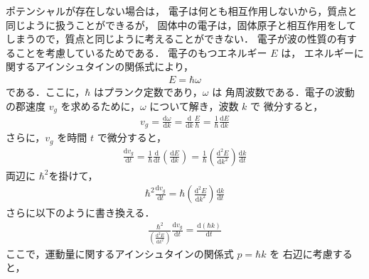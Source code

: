                 ポテンシャルが存在しない場合は，
                電子は何とも相互作用しないから，質点と同じように扱うことができるが，
                固体中の電子は，固体原子と相互作用をしてしまうので，質点と同じように考えることができない．
                電子が波の性質の有することを考慮しているためである．
                電子のもつエネルギー $E$ は，
                エネルギーに関するアインシュタインの関係式により，
                   \begin{align}
                        E=\hbar \omega
                   \end{align}
                である．ここに，$\hbar$ はプランク定数であり，$\omega$ は
                角周波数である．電子の波動の郡速度 $v_{g}$ を求めるために，$\omega$ について解き，波数 $k$ で
                微分すると，
                    \begin{align}
                        v_{g}=\frac{\mathrm{d} \omega}{\mathrm{d} k} = \frac{\mathrm{d} }{\mathrm{d} k}\frac{E}{\hbar}
                        =\frac{1}{\hbar}\frac{\mathrm{d} E}{\mathrm{d} k}
                    \end{align}
                さらに，$v_{g}$ を時間 $t$ で微分すると，
                   \begin{align}
                    \frac{\mathrm{d} v_{g}}{\mathrm{d} t}=\frac{1}{\hbar}\frac{\mathrm{d}}{\mathrm{d} t}
                    \left(\frac{\mathrm{d} E}{\mathrm{d} k}\right)
                    =\frac{1}{\hbar}
                    \left(\frac{\mathrm{d}^{2} E}{\mathrm{d} k^{2}}\right)
                    \frac{\mathrm{d} k}{\mathrm{d} t}
                   \end{align}
                両辺に $\hbar^{2}$を掛けて，
                    \begin{align}
                     \hbar^{2}\frac{\mathrm{d} v_{g}}{\mathrm{d} t}
                     =\hbar\left(\frac{\mathrm{d}^{2} E}{\mathrm{d} k^{2}}\right)\frac{\mathrm{d} k}{\mathrm{d} t}
                    \end{align}
                さらに以下のように書き換える．
                    \begin{align}
                        \frac{\hbar^{2}}{
                        \displaystyle\left(\frac{\mathrm{d}^{2} E}{\mathrm{d} k^{2}}\right)}\frac{\mathrm{d} v_{g}}{\mathrm{d} t}
                        =\frac{\mathrm{d} (\hbar k)}{\mathrm{d} t}
                        \end{align}
                ここで，運動量に関するアインシュタインの関係式 $p=\hbar k$ を
                右辺に考慮すると，
